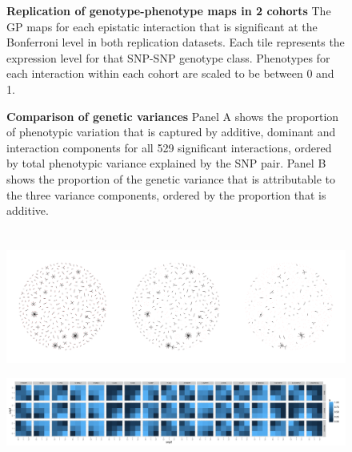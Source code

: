 \documentclass{article}
\begin{document}
\begin{figure}
	\caption{\textbf{Replication of genotype-phenotype maps in 2 cohorts} The GP maps for each epistatic interaction that is significant at the Bonferroni level in both replication datasets. Each tile represents the expression level for that SNP-SNP genotype class. Phenotypes for each interaction within each cohort are scaled to be between 0 and 1.}
	\label{fig:gpmaps}
\end{figure}

\begin{figure}
	\caption{\textbf{Comparison of genetic variances} Panel A shows the proportion of phenotypic variation that is captured by additive, dominant and interaction components for all 529 significant interactions, ordered by total phenotypic variance explained by the SNP pair. Panel B shows the proportion of the genetic variance that is attributable to the three variance components, ordered by the proportion that is additive.}
	\label{fig:variancecomponents}
\end{figure}



\clearpage
\section*{}
\setcounter{figure}{0}

\begin{figure}
\centering
\includegraphics[width=5in]{hairballs_all_reps.pdf}
\caption{}
\end{figure}
\clearpage

\begin{figure}
\centering
\includegraphics[width=5in]{gpbonfrep.pdf}
\caption{}
\end{figure}
\clearpage
\end{document}
